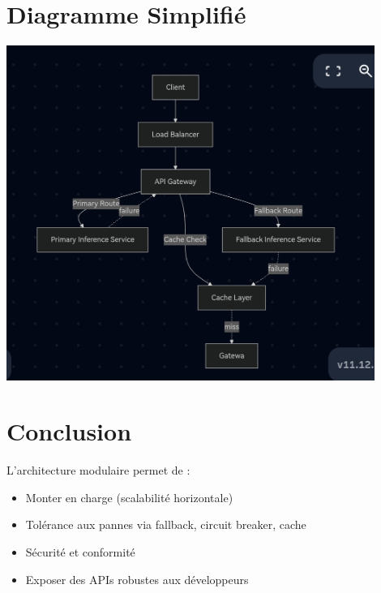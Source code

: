 \documentclass[12pt,a4paper]{article}
\begin{document}
\section*{Diagramme Simplifié}
\begin{center}
    \includegraphics[width=0.9\textwidth]{mermaid.jpg}
\end{center}

\section*{Conclusion}
L’architecture modulaire permet de :
\begin{itemize}
    \item Monter en charge (scalabilité horizontale)
    \item Tolérance aux pannes via fallback, circuit breaker, cache
    \item Sécurité et conformité
    \item Exposer des APIs robustes aux développeurs
\end{itemize}
\end{document}
